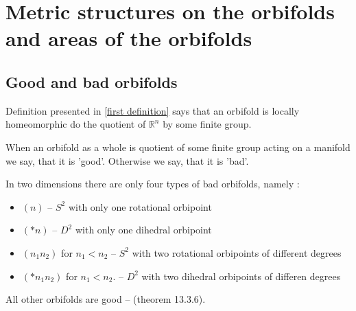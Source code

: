 
\section{Metric structures on the orbifolds and areas of the orbifolds}

\subsection{Good and bad orbifolds}
Definition presented in \ref{first definition} 
says that an orbifold is locally homeomorphic do the quotient of $\mathbb{R}^n$ 
by some finite group. 

When an orbifold as a whole is quotient of some finite group acting on a manifold we say, that 
it is 'good'. Otherwise we say, that it is 'bad'. 


In two dimensions there are only four types of bad orbifolds, namely
: 
\begin{itemize}
\item $(n)$ -- $S^2$ with only one rotational orbipoint 
\item $(*n)$ -- $D^2$ with only one dihedral orbipoint
\item $(n_1n_2)$ for $n_1 < n_2$ -- $S^2$ with two rotational orbipoints of different degrees 
\item $(*n_1n_2)$ for $n_1 < n_2$. -- $D^2$ with two dihedral orbipoints of differen degrees 
\end{itemize}
All other orbifolds are good -- \cite{Thurston1979} (theorem 13.3.6).

